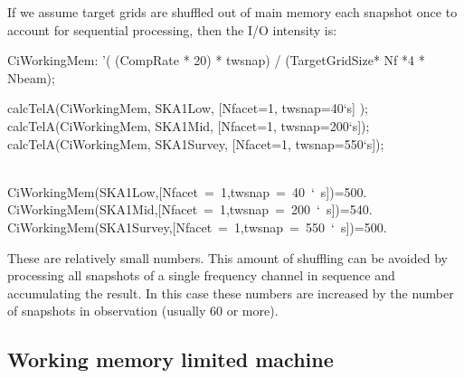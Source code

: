 \documentclass[useAMS,usenatbib,referee]{article}
\begin{document}
If we assume target grids are shuffled out of main memory each
snapshot once to account for sequential processing, then the I/O
intensity is:
\begin{maxima}[]

CiWorkingMem: '( (CompRate * 20)  * twsnap) / (TargetGridSize* Nf *4 * Nbeam);

calcTelA(CiWorkingMem, SKA1Low, [Nfacet=1, twsnap=40`s] );
calcTelA(CiWorkingMem, SKA1Mid, [Nfacet=1, twsnap=200`s]);
calcTelA(CiWorkingMem, SKA1Survey, [Nfacet=1, twsnap=550`s]);


\maximaoutput*
{} \\
\m  \mbox{{}CiWorkingMem(SKA1Low,[Nfacet = 1,twsnap = 40 ` s]){}}=500. \\
\m  \mbox{{}CiWorkingMem(SKA1Mid,[Nfacet = 1,twsnap = 200 ` s]){}}=540. \\
\m  \mbox{{}CiWorkingMem(SKA1Survey,[Nfacet = 1,twsnap = 550 ` s]){}}=500. \\
\end{maxima}

These are relatively small numbers. This amount of shuffling can be
avoided by processing all snapshots of a single frequency channel in
sequence and accumulating the result. In this case these numbers are
increased by the number of snapshots in observation (usually 60 or
more).


\subsection{Working memory limited machine}
\end{document}
